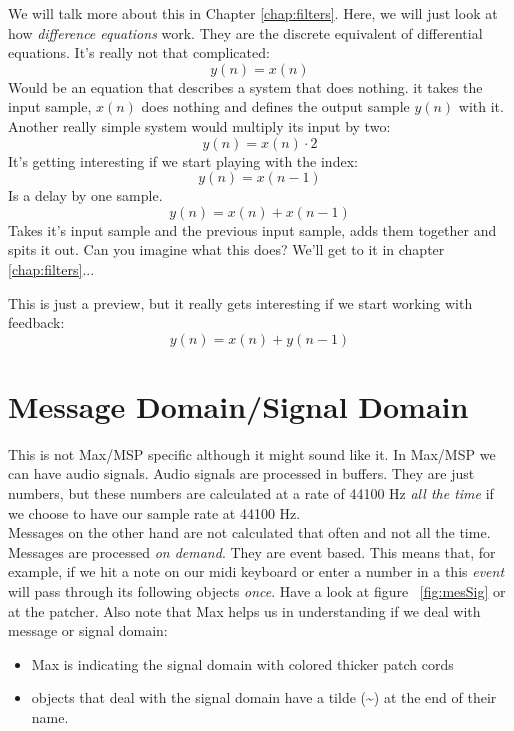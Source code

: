 We will talk more about this in Chapter \ref{chap:filters}. Here, we will just look at how \textit{difference equations} work. They are the discrete equivalent of differential equations. It's really not that complicated:
\begin{equation}
	y(n) = x(n)
\end{equation}
Would be an equation that describes a system that does nothing. it takes the input sample, $x(n)$ does nothing and defines the output sample $y(n)$ with it.
Another really simple system would multiply its input by two:
\begin{equation}
	y(n) = x(n)\cdot 2
\end{equation}
It's getting interesting if we start playing with the index:
\begin{equation}
	y(n) = x(n-1)
\end{equation}
Is a delay by one sample.
\begin{equation}
	y(n) = x(n)+x(n-1)
\end{equation}
Takes it's input sample and the previous input sample, adds them together and spits it out. Can you imagine what this does? We'll get to it in chapter \ref{chap:filters}...

This is just a preview, but it really gets interesting if we start working with feedback:
\begin{equation}
 	y(n) = x(n)+y(n-1)
 \end{equation}


\section{Message Domain/Signal Domain}
This is not Max/MSP specific although it might sound like it.
In Max/MSP we can have audio signals. Audio signals are processed in buffers. They are just numbers, but these numbers are calculated at a rate of 44100 Hz \textit{all the time} if we choose to have our sample rate at 44100 Hz.\\
Messages on the other hand are not calculated that often and not all the time. Messages are processed \textit{on demand}. They are event based. This means that, for example, if we hit a note on our midi keyboard or enter a number in a  this \textit{event} will pass through its following objects \textit{once}. Have a look at figure ~\ref{fig:mesSig} or at the patcher. Also note that Max helps us in understanding if we deal with message or signal domain:

\begin{itemize}
	\item Max is indicating the signal domain with colored thicker patch cords
	\item objects that deal with the signal domain have a tilde (\textasciitilde ) at the end of their name.
\end{itemize}

